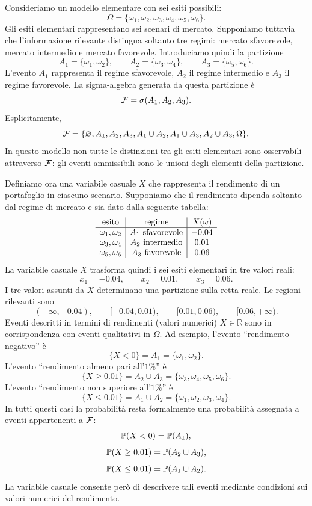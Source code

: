 Consideriamo un modello elementare con sei esiti possibili:
\[
\Omega=\{\omega_{1},\omega_{2},\omega_{3},\omega_{4},\omega_{5},\omega_{6}\}.
\]
Gli esiti elementari rappresentano sei scenari di mercato. Supponiamo tuttavia
che l'informazione rilevante distingua soltanto tre regimi: mercato
sfavorevole, mercato intermedio e mercato favorevole. Introduciamo quindi la
partizione
\[
A_{1}=\{\omega_{1},\omega_{2}\}, \qquad A_{2}=\{\omega_{3},\omega_{4}\},
\qquad A_{3}=\{\omega_{5},\omega_{6}\}.
\]
L'evento $A_{1}$ rappresenta il regime sfavorevole, $A_{2}$ il regime
intermedio e $A_{3}$ il regime favorevole. La sigma-algebra generata da questa
partizione \`{e}
\[
\mathcal{F}=\sigma(A_{1},A_{2},A_{3}).
\]
Esplicitamente,
\[
\mathcal{F}= \{\varnothing, A_{1},A_{2},A_{3}, A_{1}\cup A_{2},A_{1}\cup
A_{3},A_{2}\cup A_{3}, \Omega\}.
\]
In questo modello non tutte le distinzioni tra gli esiti elementari sono
osservabili attraverso $\mathcal{F}$: gli eventi ammissibili sono le unioni
degli elementi della partizione.

Definiamo ora una variabile casuale $X$ che rappresenta il rendimento di un
portafoglio in ciascuno scenario. Supponiamo che il rendimento dipenda
soltanto dal regime di mercato e sia dato dalla seguente tabella:
\[%
\begin{array}
[c]{c|c|c}%
\mbox{esito} & \mbox{regime} & X(\omega)\\\hline
\omega_{1},\omega_{2} & A_{1}\ \mbox{sfavorevole} & -0.04\\
\omega_{3},\omega_{4} & A_{2}\ \mbox{intermedio} & 0.01\\
\omega_{5},\omega_{6} & A_{3}\ \mbox{favorevole} & 0.06
\end{array}
\]
La variabile casuale $X$ trasforma quindi i sei esiti elementari in tre valori
reali:
\[
x_{1}=-0.04, \qquad x_{2}=0.01, \qquad x_{3}=0.06.
\]
I tre valori assunti da $X$ determinano una partizione sulla retta reale. Le
regioni rilevanti sono
\[
(-\infty,-0.04), \qquad[-0.04,0.01), \qquad[0.01,0.06), \qquad[0.06,+\infty).
\]
Eventi descritti in termini di rendimenti (valori numerici) $X \in\mathbb{R}$
sono in corrispondenza con eventi qualitativi in $\Omega$. Ad esempio,
l'evento ``rendimento negativo'' \`{e}
\[
\{X<0\}=A_{1}=\{\omega_{1},\omega_{2}\}.
\]
L'evento ``rendimento almeno pari all'$1\%$'' \`{e}
\[
\{X\geq0.01\}=A_{2}\cup A_{3} =\{\omega_{3},\omega_{4},\omega_{5},\omega
_{6}\}.
\]
L'evento ``rendimento non superiore all'$1\%$'' \`{e}
\[
\{X\leq0.01\}=A_{1}\cup A_{2} =\{\omega_{1},\omega_{2},\omega_{3},\omega
_{4}\}.
\]
In tutti questi casi la probabilit\`{a} resta formalmente una probabilit\`{a}
assegnata a eventi appartenenti a $\mathcal{F}$:
\[
\mathbb{P}(X<0)=\mathbb{P}(A_{1}),
\]
\[
\mathbb{P}(X\geq0.01)=\mathbb{P}(A_{2}\cup A_{3}),
\]
\[
\mathbb{P}(X\leq0.01)=\mathbb{P}(A_{1}\cup A_{2}).
\]
La variabile casuale consente per\`{o} di descrivere tali eventi mediante
condizioni sui valori numerici del rendimento.

